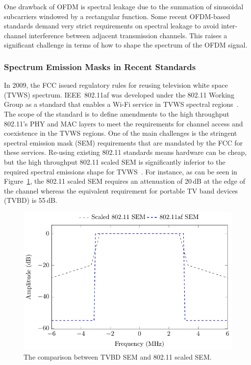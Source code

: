 One drawback of OFDM is spectral leakage due to the summation of sinusoidal subcarriers windowed by a rectangular function.
Some recent OFDM-based standards demand very strict requirements on spectral leakage to avoid inter-channel interference between adjacent transmission channels.
This raises a significant challenge in terms of how to shape the spectrum of the OFDM signal.

\subsubsection{Spectrum Emission Masks in Recent Standards}
In 2009, the FCC issued regulatory rules for reusing television white space (TVWS) spectrum.
IEEE~802.11af was developed under the 802.11 Working Group as a standard that enables a Wi-Fi service in TVWS spectral regions~\cite{802-11af2013}.
The scope of the standard is to define amendments to the high throughput 802.11's PHY and MAC layers to meet the requirements for channel access and coexistence in the TVWS regions.
One of the main challenges is the stringent spectral emission mask (SEM) requirements that are mandated by the FCC for these services.
Re-using existing 802.11 standards means hardware can be cheap, but the high throughput 802.11 scaled SEM is significantly inferior to the required spectral emissions shape for TVWS~\cite{Shellhammer2009}.
For instance, as can be seen in Figure~\ref{fig:SEMCompare}, the 802.11 scaled SEM requires an attenuation of 20\,dB at the edge of the channel whereas the equivalent requirement for portable TV band devices (TVBD) is 55\,dB.

\begin{figure}
	\centerline{\includegraphics [width=0.7\columnwidth] {figures/802_11a_afSEM.pdf} }
	\caption{The comparison between TVBD SEM and 802.11 scaled SEM.}
	\label{fig:SEMCompare}
\end{figure}

